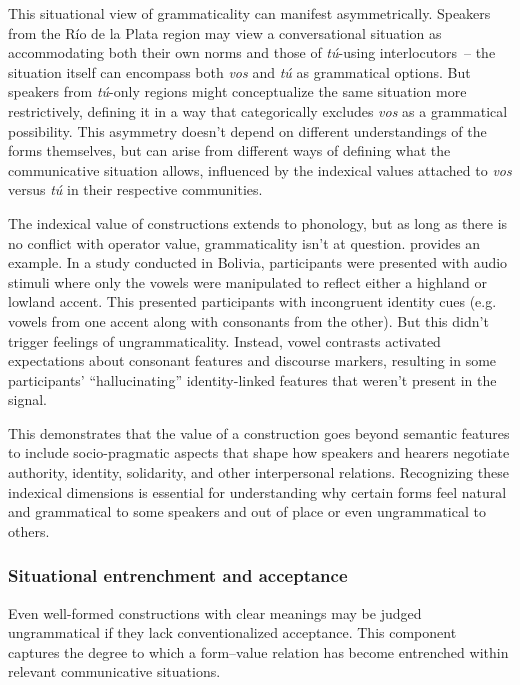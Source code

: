 \documentclass[12pt,letterpaper]{article}
\newcommand{\olang}[1]{\textit{#1}}
\begin{document}
This situational view of grammaticality can manifest asymmetrically. Speakers from the Río de la Plata region may view a conversational situation as accommodating both their own norms and those of \olang{tú}-using interlocutors~-- the situation itself can encompass both \olang{vos} and \olang{tú} as grammatical options. But speakers from \olang{tú}-only regions might conceptualize the same situation more restrictively, defining it in a way that categorically excludes \olang{vos} as a grammatical possibility. This asymmetry doesn't depend on different understandings of the forms themselves, but can arise from different ways of defining what the communicative situation allows, influenced by the indexical values attached to \olang{vos} versus \olang{tú} in their respective communities.

The indexical value of constructions extends to phonology, but as long as there is no conflict with operator value, grammaticality isn't at question. \textcite{Babel2025} provides an example. In a study conducted in Bolivia, participants were presented with audio stimuli where only the vowels were manipulated to reflect either a highland or lowland accent. This presented participants with incongruent identity cues (e.g.\, vowels from one accent along with consonants from the other). But this didn't trigger feelings of ungrammaticality. Instead, vowel contrasts activated expectations about consonant features and discourse markers, resulting in some participants' \enquote{hallucinating} identity-linked features that weren't present in the signal.

This demonstrates that the value of a construction goes beyond semantic features to include socio-pragmatic aspects that shape how speakers and hearers negotiate authority, identity, solidarity, and other interpersonal relations. Recognizing these indexical dimensions is essential for understanding why certain forms feel natural and grammatical to some speakers and out of place or even ungrammatical to others.

\subsubsection{Situational entrenchment and acceptance}\label{sec:community-acceptance}

Even well-formed constructions with clear meanings may be judged ungrammatical if they lack conventionalized acceptance. This component captures the degree to which a form--value relation has become entrenched within relevant communicative situations.
\end{document}
